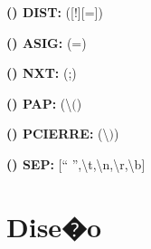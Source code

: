 \documentclass[11pt,oneside,onecolumn,openany,spanish]{book}
\begin{document}
	\textbf{(\mystar ) DIST:} ([!][=])
	
	\textbf{(\mystar ) ASIG:} (=)
	
	\textbf{(\mystar ) NXT:} (;)
	
	\textbf{(\mystar ) PAP:} (\textbackslash $($)
	
	\textbf{(\mystar ) PCIERRE:} (\textbackslash $)$)
	
	\textbf{(\mystar ) SEP:} ["` "',\textbackslash t,\textbackslash n,\textbackslash r,\textbackslash b]
	
\section{Dise�o}
\label{cap2:sec:disenyo}
\end{document}
